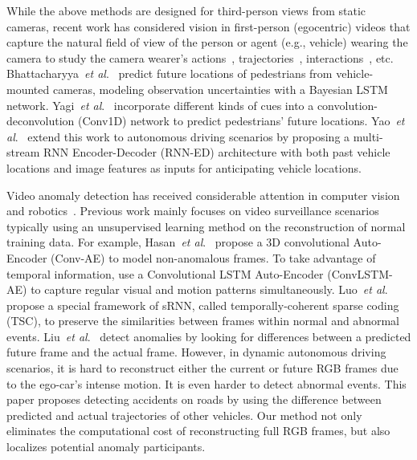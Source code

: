 \documentclass[letterpaper, 10 pt, conference]{ieeeconf}
\theoremstyle{definition}
\theoremstyle{remark}
\newcommand{\etal}{\textit{et al}.}
\begin{document}
While the above methods are designed for third-person views
from static cameras, recent work has considered vision in
first-person (egocentric) videos that capture the natural field of
view of the person or agent (e.g., vehicle) wearing the
camera to study the
camera wearer's actions~\cite{li2015delving,ma2016going},
trajectories~\cite{bertasius2018egocentric},
interactions~\cite{fan2017identifying,xu2018joint}, etc.
Bhattacharyya~\etal~\cite{Bhattacharyya_2018_CVPR} predict
future locations of pedestrians from vehicle-mounted cameras,
modeling observation
uncertainties with a Bayesian LSTM network.
Yagi~\etal~\cite{Yagi_2018_CVPR} incorporate different kinds of cues
into a convolution-deconvolution (Conv1D) network to predict
pedestrians' future locations. Yao~\etal~\cite{yao2018egocentric}
extend this work to autonomous driving scenarios by proposing a
multi-stream RNN Encoder-Decoder (RNN-ED) architecture with both past
vehicle locations and image features as inputs for anticipating
vehicle locations.

  Video anomaly detection has received
considerable attention in computer vision and
robotics~\cite{chandola2009anomaly}. Previous work mainly focuses on
video surveillance scenarios typically using an unsupervised learning
method on the reconstruction of normal training data. For example,
Hasan~\etal~\cite{hasan2016learning} propose a 3D convolutional
Auto-Encoder (Conv-AE) to model non-anomalous frames. To take 
advantage of temporal information,
\cite{medel2016anomaly,chong2017abnormal} use a Convolutional LSTM
Auto-Encoder (ConvLSTM-AE) to capture regular visual and motion
patterns simultaneously. Luo~\etal~\cite{luo2017revisit} propose a
special framework of sRNN, called temporally-coherent sparse coding
(TSC), to preserve the similarities between frames within normal and
abnormal events. Liu~\etal~\cite{liu2018future} detect anomalies by
looking for differences between a predicted future frame and the
actual frame. However, in dynamic autonomous driving scenarios, it is
hard to reconstruct either the current or future RGB frames due to the
ego-car's intense motion. It is even harder to detect abnormal
events. This paper proposes detecting
accidents on roads by using the difference between predicted and actual
trajectories of other vehicles. Our method not only eliminates the
computational cost of reconstructing full RGB frames, but also 
localizes potential anomaly participants.
\end{document}
